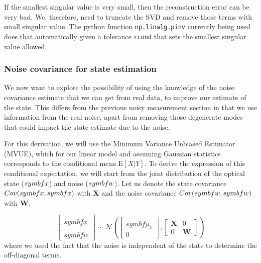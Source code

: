 \documentclass[SE,authoryear,toc]{lsstdoc}
\renewcommand{\v}[1]{\mathbf{#1}}
\begin{document}
If the smallest singular value is very small, then the reconstruction error can be very bad. We, therefore, need to truncate the SVD and remove those terms with small singular value. The python function \texttt{np.linalg.pinv} currently being used does that automatically given a tolerance \texttt{rcond} that sets the smallest singular value allowed.
\subsubsection*{Noise covariance for state estimation}
We now want to explore the possibility of using the knowledge of the noise covariance estimate that we can get from real data, to improve our estimate of the state. This differs from the previous noisy measurement section in that we use information from the real noise, apart from removing those degenerate modes that could impact the state estimate due to the noise. 

For this derivation, we will use the Minimum Variance Unbiased Estimator (MVUE), which for our linear model and assuming Gaussian statistics corresponds to the conditional mean $\mathrm{E}[X | Y]$. To derive the expression of this conditional expectation, we will start from the joint distribution of the optical state ($\\symbf{x}$) and noise ($\\symbf{w}$). Let us denote the state covariance $Cov(\\symbf{x}, \\symbf{x})$ with  $\v{X}$ and the noise covariance $Cov(\\symbf{w}, \\symbf{w})$ with $\v{W}$.  

\begin{equation}
    \begin{bmatrix}
        \\symbf{x} \\
        \\symbf{w}
    \end{bmatrix}
    \sim \mathcal{N} \left(
    \begin{bmatrix}
        \\symbf{\mu_x} \\
        0
    \end{bmatrix},
    \begin{bmatrix}
        \v{X} & 0 \\
        0 & \v{W}
    \end{bmatrix}
    \right) 
\end{equation}
where we used the fact that the noise is independent of the state to determine the off-diagonal terms.
\end{document}
